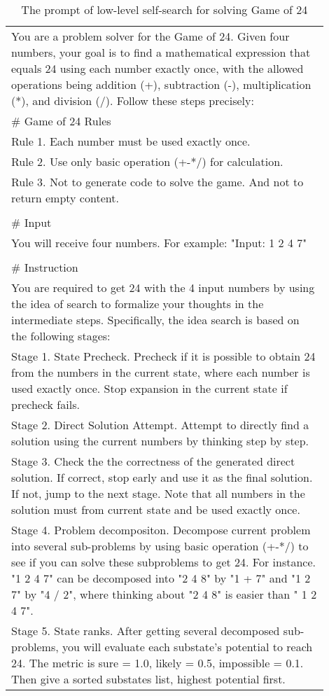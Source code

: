 \begin{table*}[t]
\small
\centering
\caption{The prompt of low-level self-search for solving Game of 24}
\begin{tabular}{p{0.9\linewidth}} \toprule
You are a problem solver for the Game of 24. Given four numbers, your goal is to find a mathematical expression that equals 24 using each number exactly once, with the allowed operations being addition (+), subtraction (-), multiplication (*), and division (/). Follow these steps precisely:\\
\# Game of 24 Rules\\
Rule 1. Each number must be used exactly once.\\
Rule 2. Use only basic operation (+-*/) for calculation.\\
Rule 3. Not to generate code to solve the game. And not to return empty content.\\
\\
\# Input\\
You will receive four numbers. For example: "Input: 1 2 4 7"\\
\\
\# Instruction\\
You are required to get 24 with the 4 input numbers by using the idea of search to formalize your thoughts in the intermediate steps. Specifically, the idea search is based on the following stages:\\
Stage 1. State Precheck. Precheck if it is possible to obtain 24 from the numbers in the current state, where each number is used exactly once. Stop expansion in the current state if precheck fails.\\
Stage 2. Direct Solution Attempt. Attempt to directly find a solution using the current numbers by thinking step by step. \\
Stage 3. Check the the correctness of the generated direct solution. If correct, stop early and use it as the final solution. If not, jump to the next stage. Note that all numbers in the solution must from current state and be used exactly once.\\
Stage 4. Problem decompositon. Decompose current problem into several sub-problems by using basic operation (+-*/) to see if you can solve these subproblems to get 24. For instance. "1 2 4 7" can be decomposed into "2 4 8" by "1 + 7" and "1 2 7" by "4 / 2", where thinking about "2 4 8" is easier than " 1 2 4 7".\\
Stage 5. State ranks. After getting several decomposed sub-problems, you will evaluate each substate's potential to reach 24. The metric is sure = 1.0, likely = 0.5, impossible = 0.1. Then give a sorted substates list, highest potential first.\\

\end{tabular}
\end{table*}
